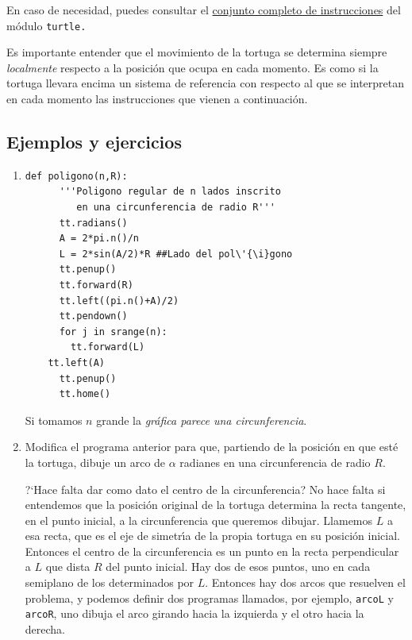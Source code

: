 \begin{appendices}
\begin{enumerate}
\begin{enumerate}
\end{enumerate}
\end{enumerate}

En caso de necesidad, puedes consultar el 
\href{https://docs.python.org/2/library/turtle.html#turtle}{conjunto completo de
instrucciones} del m\'odulo {\tt turtle.}


Es importante entender que el movimiento de la tortuga se determina siempre
{\itshape localmente} respecto a la posici\'on que ocupa en cada momento. Es
como si la tortuga llevara  encima un sistema de referencia con respecto al que
se interpretan en cada momento las instrucciones que vienen a continuaci\'on. 


\subsection*{Ejemplos y ejercicios}

\begin{enumerate}
\item  
\begin{lstlisting}
def poligono(n,R):
      '''Poligono regular de n lados inscrito
         en una circunferencia de radio R''' 
      tt.radians()
      A = 2*pi.n()/n
      L = 2*sin(A/2)*R ##Lado del pol\'{\i}gono
      tt.penup()
      tt.forward(R)
      tt.left((pi.n()+A)/2)
      tt.pendown()
      for j in srange(n):
        tt.forward(L)
	tt.left(A)
      tt.penup()
      tt.home()
\end{lstlisting}

 Si tomamos $n$  grande la {\itshape gr\'afica parece una circunferencia}.

 \item Modifica el programa anterior para que, partiendo de la posici\'on en
que est\'e la tortuga, dibuje un arco de $\alpha$ radianes en una circunferencia
de radio $R$. 

?`Hace falta dar como dato el centro de la circunferencia?  No
hace falta si entendemos que la posici\'on original de la tortuga determina
la recta tangente, en el punto inicial,  a la circunferencia que queremos
dibujar. Llamemos $L$ a esa recta, que es el eje de simetr\'{\i}a de la
propia tortuga en su posici\'on inicial. Entonces el centro de la circunferencia
es un punto en la recta perpendicular a $L$ que dista $R$ del punto
inicial. Hay dos de esos puntos, uno en cada semiplano de los determinados por
$L$.  Entonces hay dos arcos que resuelven el problema, y podemos definir dos
programas llamados, por ejemplo, \lstinline|arcoL| y \lstinline|arcoR|, uno
dibuja el arco girando hacia la izquierda y el otro hacia la derecha. 
 

\end{enumerate}
\end{appendices}
